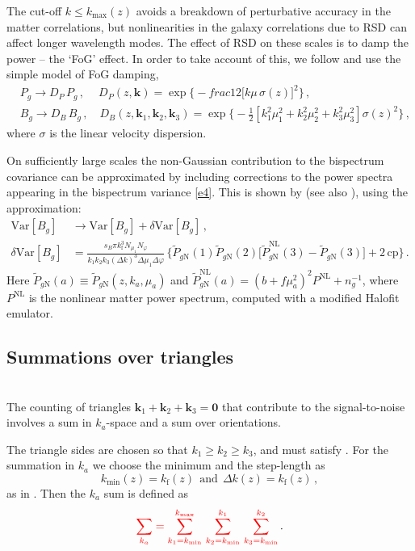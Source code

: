 The  cut-off $k\leq k_{\mathrm{max}}(z)$  avoids a breakdown of perturbative accuracy in the matter correlations, but nonlinearities in the galaxy correlations due to RSD can affect longer wavelength modes. The effect of RSD on these scales is to damp the power -- the  `FoG' effect. In order to take account of this, we follow \cite{Karagiannis:2018jdt,Yankelevich:2018uaz} and use the simple model of FoG damping,
\begin{align}
&P_g \to  D_P\, P_g\,,\quad~ D_{P}(z, \bm{k}) = \exp\Big\{-frac{1}{2}{\big[k\mu\,\sigma(z)\big]^{2}}\Big\}\,, \\
&B_g \to  D_B\, B_g\,,  \quad D_{B}(z, \bm{k}_{1},\bm{k}_{2},\bm{k}_{3}) = \exp\Big\{-\frac{1}{2}{\left[k_{1}^{2}\mu_{1}^{2}+k_{2}^{2}\mu_{2}^{2}+k_{3}^{2}\mu_{3}^{2}\right]\sigma(z)^{2}}\Big\}\,, \label{e13}
\end{align}
where $\sigma$ is the linear velocity dispersion.

On sufficiently large scales the non-Gaussian contribution to the bispectrum covariance can be  approximated by including corrections to the power spectra appearing in the bispectrum variance \eqref{e4}. This is shown by  \cite{Chan:2016ehg}  (see also \cite{Karagiannis:2018jdt}), using  the approximation:
\begin{align}
{\mathrm{Var}} [{B_{g}}] &\to  {\mathrm{Var}} [{B_{g}}]+ \delta {\mathrm{Var}} [{B_{g}}] \,, \\
\delta {\mathrm{Var}} [{B_{g}}] &= \frac{s_B\pi k_{\mathrm{f}}^3N_{\mu_1}N_\varphi}{k_1k_2k_3 (\Delta k)^3\Delta \mu_1 \Delta \varphi}\, \Big\{\tilde{P}_{g{\mathrm{N}}}(1) \tilde{P}_{g{\mathrm{N}}}(2)\Big[ \tilde{P}^{\mathrm{NL}}_{g{\mathrm{N}}}(3)-\tilde{P}_{g{\mathrm{N}}}(3)\Big] +2\, \mbox{cp}\Big\}\,.
\label{e4x}
\end{align}
Here $\tilde{P}_{g{\mathrm{N}}}(a)\equiv \tilde{P}_{g{\mathrm{N}}}(z,k_a,\mu_a)$ and $\tilde{P}^{\mathrm{NL}}_{g{\mathrm{N}}}(a) = (b+f\mu_a^2)^2P^{\mathrm{NL}}+n_g^{-1}$, where $P^{\mathrm{NL}}$ is the nonlinear matter power spectrum, computed with a modified Halofit emulator.
%
\subsection{Summations {over triangles}} 
~\\
The counting of triangles $\bm{k}_{1}+\bm{k}_{2}+\bm{k}_{3}=\bm{0}$ that contribute to the signal-to-noise  involves a sum in $k_a$-space and a sum over orientations.

The triangle sides are chosen so that $k_1\geq k_2 \geq k_3$, and must satisfy  .
For the summation in $k_a$ we choose the minimum and  the step-length as
\begin{equation}
k_{\mathrm{min}}(z)=k_{\mathrm{f}}(z)~~\mbox{and}~~ \Delta k(z)=k_{\mathrm{f}}(z) \,,
\end{equation}
as in \cite{Karagiannis:2018jdt,Yankelevich:2018uaz}. 
Then the $k_a$ sum is defined as \cite{Liguori:2010hx,Oddo:2019run}
\begin{equation}
 {\color{red}{\sum_{k_a} = \sum_{k_{1}=k_{\mathrm{min}}}^{k_{\mathrm{max}}}\,\sum_{k_{2}=k_{\mathrm{min}}}^{k_{1}}\,\sum_{k_{3}=k_{\mathrm{min}}}^{k_{2}}}}
\,.\label{e8}
\end{equation} 

